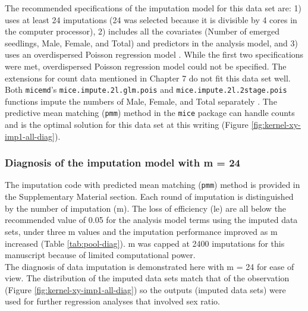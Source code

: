 \documentclass[
]{article}
\begin{document}
The recommended specifications of the imputation model for this data set are: 1) uses at least 24 imputations (24 was selected because it is divisible by 4 cores in the computer processor), 2) includes all the covariates (Number of emerged seedlings, Male, Female, and Total) and predictors in the analysis model, and 3) uses an overdispersed Poisson regression model \citetext{\citealp{azurMultipleImputationChained2011}; \citealp{whiteMultipleImputationUsing2011}; \citealp[and][]{nguyenModelCheckingMultiple2017}}. While the first two specifications were met, overdispersed Poisson regression model could not be specified. The extensions for count data mentioned in Chapter 7 \citep{vanbuurenFlexibleImputationMissing2018} do not fit this data set well. Both \texttt{micemd}'s \texttt{mice.impute.2l.glm.pois} and \texttt{mice.impute.2l.2stage.pois} functions impute the numbers of Male, Female, and Total separately \citep{audigierMicemdMultipleImputation2019}. The predictive mean matching (\texttt{pmm}) method in the \texttt{mice} package can handle counts \citep{vanbuurenMiceMultivariateImputation2011} and is the optimal solution for this data set at this writing (Figure \ref{fig:kernel-xy-imp1-all-diag}).

\hypertarget{diagnosis-of-the-imputation-model-with-m-24}{%
\subsubsection*{Diagnosis of the imputation model with m = 24}\label{diagnosis-of-the-imputation-model-with-m-24}}

The imputation code with predicted mean matching (\texttt{pmm}) method is provided in the Supplementary Material section. Each round of imputation is distinguished by the number of imputation (m). The loss of efficiency (le) are all below the recommended value of 0.05 \citep{whiteMultipleImputationUsing2011} for the analysis model terms using the imputed data sets, under three m values and the imputation performance improved as m increased (Table \ref{tab:pool-diag}). m was capped at 2400 imputations for this manuscript because of limited computational power.\\
The diagnosis of data imputation is demonstrated here with m = 24 for ease of view. The distribution of the imputed data sets match that of the observation (Figure \ref{fig:kernel-xy-imp1-all-diag}) so the outputs (imputed data sets) were used for further regression analyses that involved sex ratio.
\end{document}
